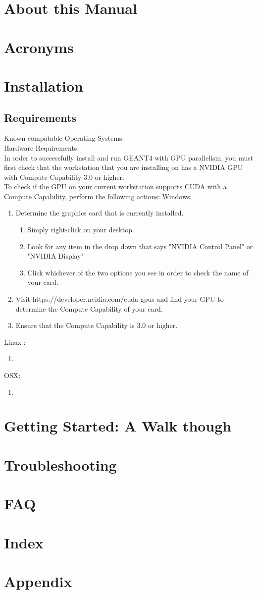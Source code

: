 \documentclass[12pt]{article}
\begin{document}
\section{About this Manual}			%
\section{Acronyms}					%
\section{Installation}				%
\subsection{Requirements}
Known compatable Operating Systems:\\
Hardware Requirements:\\
In order to successfully install and run GEANT4 with GPU parallelism, you must first check that the workstation that you are installing on has a NVIDIA GPU with Compute Capability 3.0 or higher.\\
To check if the GPU on your current workstation supports CUDA with a Compute Capability, perform the following actions:
Windows:\\
\begin{enumerate}
\item Determine the graphics card that is currently installed.
\begin{enumerate}
\item Simply right-click on your desktop.
\item Look for any item in the drop down that says "NVIDIA Control Panel" or "NVIDIA Display" 
\item Click whichever of the two options you see in order to check the name of your card.
\end{enumerate}
\item Visit https://developer.nvidia.com/cuda-gpus and find your GPU to determine the Compute Capability of your card. 
\item Ensure that the Compute Capability is 3.0 or higher.
\end{enumerate}
Linux :
\begin{enumerate}
\item 
\end{enumerate}
OSX:
\begin{enumerate}
\item 
\end{enumerate}
\section{Getting Started: A Walk though}	%
\section{Troubleshooting}				%
\section{FAQ}					%
\section{Index}					%
\section{Appendix}					%
\end{document}
